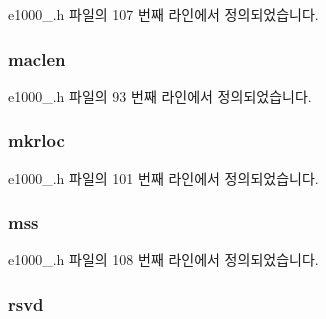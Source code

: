 e1000\+\_.\+h 파일의 107 번째 라인에서 정의되었습니다.

\subsubsection[{\texorpdfstring{maclen}{maclen}}]{ maclen}\hypertarget{structe1000__adv__context__desc_aae43109ff20190199a88677865d64bb8}{}\label{structe1000__adv__context__desc_aae43109ff20190199a88677865d64bb8}


e1000\+\_.\+h 파일의 93 번째 라인에서 정의되었습니다.

\subsubsection[{\texorpdfstring{mkrloc}{mkrloc}}]{ mkrloc}\hypertarget{structe1000__adv__context__desc_a53092caeeb97e937f9b21c0f1ad6a89b}{}\label{structe1000__adv__context__desc_a53092caeeb97e937f9b21c0f1ad6a89b}


e1000\+\_.\+h 파일의 101 번째 라인에서 정의되었습니다.

\subsubsection[{\texorpdfstring{mss}{mss}}]{ mss}\hypertarget{structe1000__adv__context__desc_ad2d27d653ff2e197065bd93e0d8e41a0}{}\label{structe1000__adv__context__desc_ad2d27d653ff2e197065bd93e0d8e41a0}


e1000\+\_.\+h 파일의 108 번째 라인에서 정의되었습니다.

\subsubsection[{\texorpdfstring{rsvd}{rsvd}}]{ rsvd}\hypertarget{structe1000__adv__context__desc_a3b6bf7c76c3f4f846232f50992776bfd}{}\label{structe1000__adv__context__desc_a3b6bf7c76c3f4f846232f50992776bfd}


